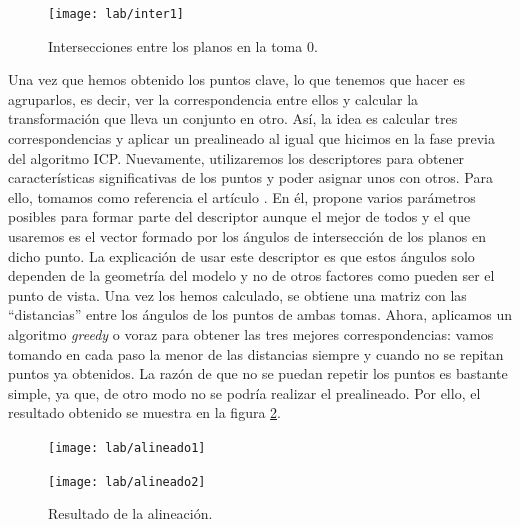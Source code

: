 \begin{figure}[h!]
	\centering
	\texttt{[image: lab/inter1]} 
	\caption{Intersecciones entre los planos en la toma 0.}
	\label{fig:inter1}
\end{figure}

Una vez que hemos obtenido los puntos clave, lo que tenemos que hacer es agruparlos, es decir, ver la correspondencia entre ellos y calcular la transformación que lleva un conjunto en otro. Así, la idea es calcular tres correspondencias y aplicar un prealineado al igual que hicimos en la fase previa del algoritmo ICP. Nuevamente, utilizaremos los descriptores para obtener características significativas de los puntos y poder asignar unos con otros. Para ello, tomamos como referencia el artículo \cite{theiler2012automatic}. En él, propone varios parámetros posibles para formar parte del descriptor aunque el mejor de todos y el que usaremos es el vector formado por los ángulos de intersección de los planos en dicho punto. La explicación de usar este descriptor es que estos ángulos solo dependen de la geometría del modelo y no de otros factores como pueden ser el punto de vista. Una vez los hemos calculado, se obtiene una matriz con las ``distancias'' entre los ángulos de los puntos de ambas tomas. Ahora, aplicamos un algoritmo \textit{greedy} o voraz para obtener las tres mejores correspondencias: vamos tomando en cada paso la menor de las distancias siempre y cuando no se repitan puntos ya obtenidos. La razón de que no se puedan repetir los puntos es bastante simple, ya que, de otro modo no se podría realizar el prealineado.  Por ello, el resultado obtenido se muestra en la figura \ref{fig:lab-alineado}. \\

\begin{figure}[h!]
	\centering
	\begin{minipage}{0.6\textwidth}
		\centering
		\texttt{[image: lab/alineado1]} 
	\end{minipage}
	\centering
	\begin{minipage}{0.6\textwidth}
		\centering
		\texttt{[image: lab/alineado2]} 
	\end{minipage}
	\caption{Resultado de la alineación.}
	\label{fig:lab-alineado}
\end{figure}

